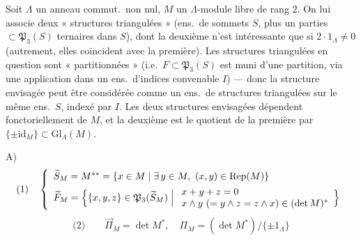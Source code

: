 \documentclass[11pt,a4paper]{article}
\begin{document}
Soit $\Lambda$ un anneau commut.\ non nul, $M$ un $\Lambda$-module libre de rang $2$. On lui associe deux « structures triangulées » (ens.\ de sommets $S$, plus un  parties  \struck{\ill{}} $\subset\mathfrak{P}_3(S)$ \struck{\ill{}} ternaires dans $S$), dont la deuxième n'est intéressante que si $2\cdot1_\Lambda\neq0$ (autrement, elles coïncident avec la première). Les structures triangulées  en question sont « partitionnées » (i.e.\ $F\subset\mathfrak{P}_3(S)$ est muni d'une partition, via une application dans un ens.\ d'indices convenable $I$) --- donc la structure envisagée peut être considérée comme un ens.\ de structures triangulées sur le même ens.\ $S$, indexé par $I$. Les deux structures envisagées dépendent fonctoriellement de $M$, et la deuxième est le quotient de la première par $\{\pm\mathrm{id}_M\}\subset\mathrm{Gl}_\Lambda(M)$.

A)
\[
\text{(1)}\quad
\left\{
\begin{array}{l}
\widetilde{S}_M = M^{**} = \{x\in M\mid \exists\, y\in M,\ (x,y)\in\mathrm{Rep}(M)\}\\[4pt]
\widetilde{F}_M = \Bigl\{\{x,y,z\}\in\mathfrak{P}_3(\widetilde{S}_M) \Bigm| \begin{array}{l} x+y+z=0\\ x\wedge y\ (=y\wedge z=z\wedge x)\in(\det M)^{*}\end{array}\Bigr\}
\end{array}
\right.
\]
\[
\text{(2)}\qquad \overrightarrow{\Pi}_M = \det M^{*},\quad \Pi_M = (\det M^{*})/\{\pm1_\Lambda\}
\]
\end{document}
